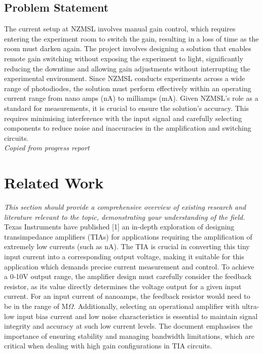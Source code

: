 \documentclass[conference]{IEEEtran}
\begin{document}
\subsection{Problem Statement}

The current setup at NZMSL involves manual gain control, which requires entering the experiment room to switch the gain, resulting in a loss of time as the room must darken again. The project involves designing a solution that enables remote gain switching without exposing the experiment to light, significantly reducing the downtime and allowing gain adjustments without interrupting the experimental environment.
Since NZMSL conducts experiments across a wide range of photodiodes, the solution must perform effectively within an operating current range from nano amps (nA) to milliamps (mA). Given NZMSL's role as a standard for measurements, it is crucial to ensure the solution's accuracy. This requires minimising interference with the input signal and carefully selecting components to reduce noise and inaccuracies in the amplification and switching circuits. \\
\textit{Copied from progress report}

\section{Related Work}

\textit{This section should provide a comprehensive overview of existing research and literature relevant to the topic, demonstrating your understanding of the field.} \\

Texas Instruments have published [1] an in-depth exploration of designing transimpedance amplifiers (TIAs) for applications requiring the amplification of extremely low currents (such as nA). The TIA is crucial in converting this tiny input current into a corresponding output voltage, making it suitable for this application which demands precise current measurement and control. To achieve a 0-10V output range, the amplifier design must carefully consider the feedback resistor, as its value directly determines the voltage output for a given input current. For an input current of nanoamps, the feedback resistor would need to be in the range of M$\Omega$. Additionally, selecting an operational amplifier with ultra-low input bias current and low noise characteristics is essential to maintain signal integrity and accuracy at such low current levels. The document emphasises the importance of ensuring stability and managing bandwidth limitations, which are critical when dealing with high gain configurations in TIA circuits.
\end{document}
